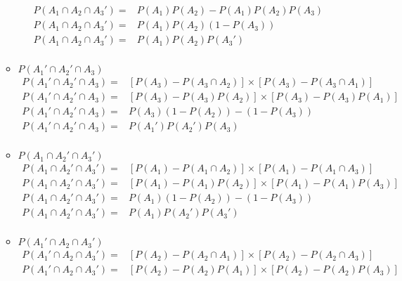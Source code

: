 \documentclass{article}
\begin{document}
\begin{enumerate}
\begin{itemize}
\begin{equation}
\begin{aligned}
        P(A_1 \cap A_2 \cap A_3') = & P(A_1) P(A_2) - P(A_1) P(A_2) P(A_3) \\
        P(A_1 \cap A_2 \cap A_3') = & P(A_1) P(A_2) (1 - P(A_3)) \\
        P(A_1 \cap A_2 \cap A_3') = & P(A_1) P(A_2) P(A_3') \\
        \end{aligned}
        \end{equation}
    \item $P(A_1' \cap A_2' \cap A_3)$
        \begin{equation}
        \begin{aligned}
        P(A_1' \cap A_2' \cap A_3) = & [P(A_3) - P(A_3 \cap A_2)] \times [P(A_3) - P(A_3 \cap A_1)] \\
        P(A_1' \cap A_2' \cap A_3) = & [P(A_3) - P(A_3) P(A_2)] \times [P(A_3) - P(A_3) P(A_1)] \\
        P(A_1' \cap A_2' \cap A_3) = & P(A_3) (1 - P(A_2)) - (1 - P(A_3)) \\
        P(A_1' \cap A_2' \cap A_3) = & P(A_1') P(A_2') P(A_3) \\
        \end{aligned}
        \end{equation}
    \item $P(A_1 \cap A_2' \cap A_3')$
        \begin{equation}
        \begin{aligned}
        P(A_1 \cap A_2' \cap A_3') = & [P(A_1) - P(A_1 \cap A_2)] \times [P(A_1) - P(A_1 \cap A_3)] \\
        P(A_1 \cap A_2' \cap A_3') = & [P(A_1) - P(A_1) P(A_2)] \times [P(A_1) - P(A_1) P(A_3)] \\
        P(A_1 \cap A_2' \cap A_3') = & P(A_1) (1 - P(A_2)) - (1 - P(A_3)) \\
        P(A_1 \cap A_2' \cap A_3') = & P(A_1) P(A_2') P(A_3') \\
        \end{aligned}
        \end{equation}
    \item $P(A_1' \cap A_2 \cap A_3')$
        \begin{equation}
        \begin{aligned}
        P(A_1' \cap A_2 \cap A_3') = & [P(A_2) - P(A_2 \cap A_1)] \times [P(A_2) - P(A_2 \cap A_3)] \\
        P(A_1' \cap A_2 \cap A_3') = & [P(A_2) - P(A_2) P(A_1)] \times [P(A_2) - P(A_2) P(A_3)] \\

\end{aligned}
\end{equation}
\end{itemize}
\end{enumerate}
\end{document}
